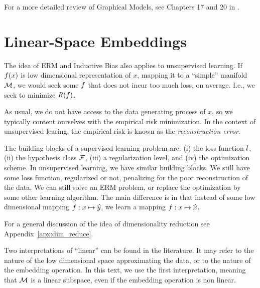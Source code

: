 For a more detailed review of Graphical Models, see Chapters 17 and 20 in \cite{wasserman_all_2004}. 















\section{Linear-Space Embeddings}
\label{sec:dim_reduce_linear}


The idea of ERM and Inductive Bias also applies to unsupervised learning.
If $f(x)$ is low dimensional representation of $x$, mapping it to a ``simple'' manifold $\mathcal{M}$, we would seek some $f$ that does not incur too much loss, on average. I.e., we seek to minimize $R(f)$.

As usual, we do not have access to the data generating process of $x$, so we typically content ourselves with the empirical risk minimization.
In the context of unsupervised learing, the empirical risk is known as the \emph{reconstruction error}.

The building blocks of a supervised learning problem are: 
(i) the loss function $l$,
(ii) the hypothesis class $\mathcal{F}$, 
(iii) a regularization level, and
(iv) the optimization scheme.
In unsupervised learning, we have similar building blocks. We still have some loss function, regularized or not, penalizing for the poor reconstruction of the data. We can still solve an ERM problem, or replace the optimization by some other learning algorithm. The main difference is in that instead of some low dimensional mapping $f:x \mapsto \widehat{y}$, we learn a mapping  $f:x \mapsto \widehat{x}$.


For a general discussion of the idea of dimensionality reduction see Appendix~\ref{apx:dim_reduce}.

\begin{remark}
\label{remark:linear}
	Two interpretations of ``linear'' can be found in the literature. It may refer to the nature of the low dimensional space approximating the data, or to the nature of the embedding operation. In this text, we use the first interpretation, meaning that $\mathcal{M}$ is a linear subspace, even if the embedding operation is non linear.
\end{remark}


